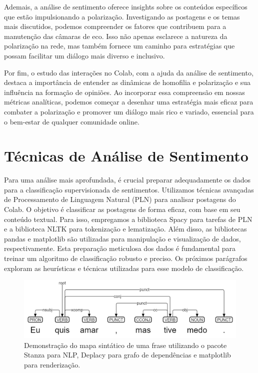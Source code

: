 Ademais, a análise de sentimento oferece insights sobre os conteúdos específicos que estão impulsionando a polarização. Investigando as postagens e os temas mais discutidos, podemos compreender os fatores que contribuem para a manutenção das câmaras de eco. Isso não apenas esclarece a natureza da polarização na rede, mas também fornece um caminho para estratégias que possam facilitar um diálogo mais diverso e inclusivo.

Por fim, o estudo das interações no Colab, com a ajuda da análise de sentimento, destaca a importância de entender as dinâmicas de homofilia e polarização e sua influência na formação de opiniões. Ao incorporar essa compreensão em nossas métricas analíticas, podemos começar a desenhar uma estratégia mais eficaz para combater a polarização e promover um diálogo mais rico e variado, essencial para o bem-estar de qualquer comunidade online.

\section{Técnicas de Análise de Sentimento}

Para uma análise mais aprofundada, é crucial preparar adequadamente os dados para a classificação supervisionada de sentimentos. Utilizamos técnicas avançadas de Processamento de Linguagem Natural (PLN) para analisar postagens do Colab. O objetivo é classificar as postagens de forma eficaz, com base em seu conteúdo textual. Para isso, empregamos a biblioteca Spacy para tarefas de PLN e a biblioteca NLTK para tokenização e lematização. Além disso, as bibliotecas pandas e matplotlib são utilizadas para manipulação e visualização de dados, respectivamente. Esta preparação meticulosa dos dados é fundamental para treinar um algoritmo de classificação robusto e preciso. Os próximos parágrafos exploram as heurísticas e técnicas utilizadas para esse modelo de classificação.

\begin{figure}[!htb]
	\caption{Demonstração do mapa sintático de uma frase utilizando o pacote Stanza para NLP, Deplacy para grafo de dependências e matplotlib para renderização.}
	\label{fig:lexicon_breakdown}
	\centering
	\includegraphics[scale=0.5]{images/lexicon_breakdown.png}
	\fautor
\end{figure}

